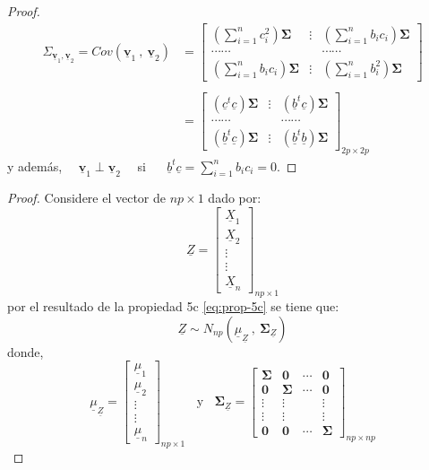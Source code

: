 \documentclass[
]{book}
\theoremstyle{definition}
\theoremstyle{definition}
\theoremstyle{definition}
\theoremstyle{definition}
\theoremstyle{remark}
\begin{document}
\begin{proof}
\begin{align*}
\Sigma_{\underline{\mathbf{v}}_1,\underline{\mathbf{v}}_2}=Cov(\underline{\mathbf{v}}_1\ , \ \underline{\mathbf{v}}_2)&=\begin{bmatrix}
\left( \sum_{i=1}^n c_i^2\right) \mathbf{\Sigma} & \vdots &  \left( \sum_{i=1}^n b_ic_i\right) \mathbf{\Sigma} \\
\cdots\cdots & & \cdots\cdots \\
\left( \sum_{i=1}^n b_ic_i\right) \mathbf{\Sigma} & \vdots & \left( \sum_{i=1}^n b_i^2\right) \mathbf{\Sigma}
\end{bmatrix}\\ \\ 
&=\begin{bmatrix}
\left( \underline{c}^t\underline{c} \right) \mathbf{\Sigma} & \vdots &  \left( \underline{b}^t\underline{c} \right) \mathbf{\Sigma} \\
\cdots\cdots & & \cdots\cdots \\
\left( \underline{b}^t\underline{c} \right) \mathbf{\Sigma} & \vdots & \left( \underline{b}^t\underline{b}\right)\mathbf{\Sigma}
\end{bmatrix}_{2p \times 2p}
\end{align*}
y además,~~ \(\underline{\mathbf{v}}_1 \perp \underline{\mathbf{v}}_2\)~~ si ~~ \(\underline{b}^t\underline{c}=\sum_{i=1}^n b_ic_i=0\).
\end{proof}

\begin{proof}
Considere el vector de \(np \times 1\) dado por:
\[
\underline{Z}=\begin{bmatrix}
\underline{X}_1 \\ \underline{X}_2
\\ \vdots \\ \vdots \\ \underline{X}_n\end{bmatrix}_{np\times 1}
\]
por el resultado de la propiedad 5c \eqref{eq:prop-5c} se tiene que:
\[
\underline{Z} \sim N_{np} (\underline{\mu}_{\underline{Z}} \ , \ \mathbf{\Sigma}_{\underline{Z}}) 
\]
donde,
\[
\underline{\mu}_{\underline{Z}}=\begin{bmatrix}
\underline{\mu}_1
\\ \underline{\mu}_2 \\ \vdots \\ \vdots \\ \underline{\mu}_n\end{bmatrix}_{np \times 1} \ \ \ \ \text{y} \ \ \ \ \mathbf{\Sigma}_{\underline{Z}}=\begin{bmatrix}
\mathbf{\Sigma} & \mathbf{0} & \cdots & \mathbf{0}\\
\mathbf{0} & \mathbf{\Sigma} & \cdots & \mathbf{0}\\
\vdots & \vdots &  & \vdots \\
\vdots & \vdots &  & \vdots \\
\mathbf{0} & \mathbf{0} & \cdots &  \mathbf{\Sigma}
\end{bmatrix}_{np \times np}
\]
\end{proof}
\end{document}
